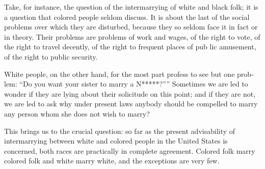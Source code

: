 \documentclass[letterpaper,10pt,english]{jupyterBook}
\begin{document}
\sphinxAtStartPar
Take, for instance, the question of the intermarrying of white and black folk; it is a question that colored people sel­dom discuss. It is about the last of the social problems over which they are dis­turbed, because they so seldom face it in fact or in theory. Their problems are problems of work and wages, of the right to vote, of the right to travel decently, of the right to frequent places of pub­ lic amusement, of the right to public security.

\sphinxAtStartPar
White people, on the other hand, for the most part profess to see but one prob­lem: “Do you want your sister to marry a N*****?”” Sometimes we are led to wonder if they are lying about their solicitude on this point; and if they are not, we are led to ask why under present laws anybody should be compelled to marry any person whom she does not wish to marry?

\sphinxAtStartPar
This brings us to the crucial question: so far as the present advisability of intermarrying between white and colored people in the United States is concerned, both races are practically in complete agreement. Colored folk marry colored folk and white marry white, and the exceptions are very few.
\end{document}

